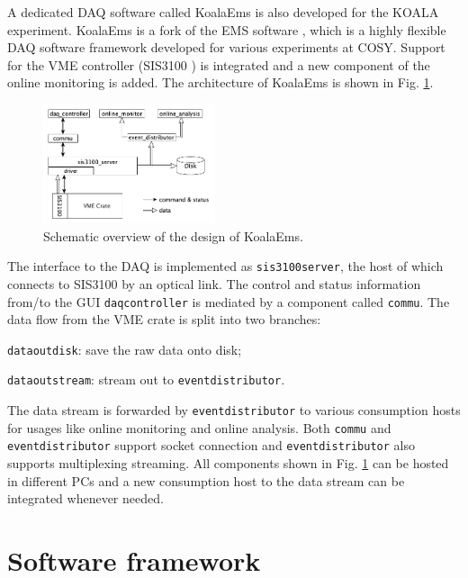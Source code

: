 \documentclass[number,5p]{elsarticle}
\begin{document}
A dedicated DAQ software called KoalaEms is also developed for the KOALA experiment.
KoalaEms is a fork of the EMS software \cite{ems}, which is a highly flexible DAQ software framework developed for various experiments at COSY.
Support for the VME controller (SIS3100 \cite{sis}) is integrated and a new
component of the online monitoring is added.
The architecture of KoalaEms is shown in Fig. \ref{fig:koalaems}.
\begin{figure}[h]
  \centering
  \includegraphics[width=0.45\textwidth]{./koalaems_deployment.png}
  \caption{Schematic overview of the design of KoalaEms.}
  \label{fig:koalaems}
\end{figure}
The interface to the DAQ is implemented as \texttt{sis3100\textunderscore server}, the host of which
connects to SIS3100 by an optical link.
The control and status information from/to the GUI \texttt{daq\textunderscore controller} is mediated by a component called \texttt{commu}.
The data flow from the VME crate is split into two branches:
\begin{enumerate*}[label=(\roman*)]
\item \texttt{data\textunderscore out\textunderscore di\allowbreak sk}: save the raw data onto disk;
\item \texttt{data\textunderscore out\textunderscore stream}: stream out to \texttt{event\textunderscore distributor}.
\end{enumerate*}
The data stream is forwarded by \texttt{event\textunderscore distributor} to various consumption hosts for usages like online monitoring and online analysis.
Both \texttt{commu} and \texttt{event\textunderscore distributor} support socket connection and \texttt{event\textunderscore distributor} also supports multiplexing streaming.
All components shown in Fig. \ref{fig:koalaems} can be hosted in different PCs
and a new consumption host to the data stream can be integrated whenever needed.

\section{Software framework}
\label{sec:software}
\end{document}
